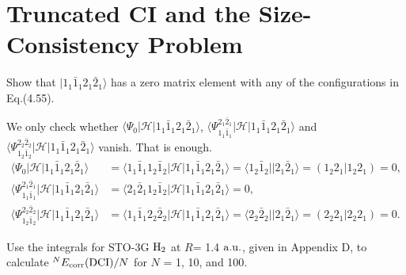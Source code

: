 \documentclass[a4paper]{book}
\newcommand{\corr}{{\rm corr}}
\newcommand{\au}{{\rm a.u.}}
\begin{document}
\begin{solution}
	\end{solution}
	
	\section{Truncated CI and the Size-Consistency Problem}	
	
	\begin{exercise}
	Show that $|1_1 \bar{1}_1 2_1 \bar{2}_1 \rangle$ has a zero matrix element with any of the configurations in Eq.(4.55).
	\end{exercise}
	
	\begin{solution}
	
	We only check whether $\langle \Psi_0 | \mathscr{H} | 1_1 \bar{1}_1 2_1 \bar{2}_1 \rangle$, $\langle \Psi^{2_1 \bar{2}_1}_{1_1 \bar{1}_1} | \mathscr{H} | 1_1 \bar{1}_1 2_1 \bar{2}_1 \rangle$ and $\langle \Psi^{2_2 \bar{2}_2}_{1_2 \bar{1}_2} | \mathscr{H} | 1_1 \bar{1}_1 2_1 \bar{2}_1 \rangle$ vanish. That is enough.	
	\begin{align}
		\langle \Psi_0 | \mathscr{H} | 1_1 \bar{1}_1 2_1 \bar{2}_1 \rangle &= \langle 1_1 \bar{1}_1 1_2 \bar{1}_2 | \mathscr{H} | 1_1 \bar{1}_1 2_1 \bar{2}_1 \rangle = \langle 1_2 \bar{1}_2 || 2_1 \bar{2}_1 \rangle = ( 1_2 2_1 | 1_2 2_1 ) = 0, \\
		\langle \Psi^{2_1 \bar{2}_1}_{1_1 \bar{1}_1} | \mathscr{H} | 1_1 \bar{1}_1 2_1 \bar{2}_1 \rangle &= \langle 2_1 \bar{2}_1 1_2 \bar{1}_2 | \mathscr{H} | 1_1 \bar{1}_1 2_1 \bar{2}_1 \rangle = 0 , \\
		\langle \Psi^{2_2 \bar{2}_2}_{1_2 \bar{1}_2} | \mathscr{H} | 1_1 \bar{1}_1 2_1 \bar{2}_1 \rangle &= \langle 1_1 \bar{1}_1 2_2 \bar{2}_2 | \mathscr{H} | 1_1 \bar{1}_1 2_1 \bar{2}_1 \rangle = \langle 2_2 \bar{2}_2 || 2_1 \bar{2}_1 \rangle = ( 2_2 2_1 | 2_2 2_1 ) = 0.
	\end{align}		
	
	\end{solution}
	
	\begin{exercise}
	Use the integrals for STO-3G $\ce{H2}$ at $R$= 1.4 $\au$, given in Appendix D, to calculate ${}^{N}E_\corr({\rm DCI})/N$ for $N$ = 1, 10, and 100.
	\end{exercise}
	
\end{document}
